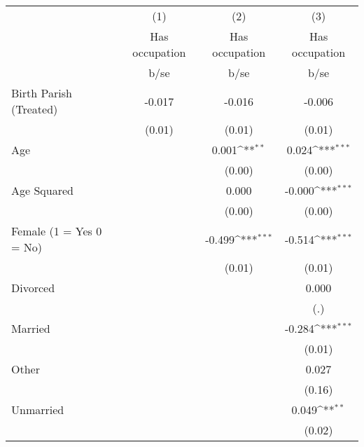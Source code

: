 {
\def\sym#1{\ifmmode^{#1}\else\(^{#1}\)\fi}
\begin{tabular}{l*{3}{c}}
\hline\hline
                    &\multicolumn{1}{c}{(1)}&\multicolumn{1}{c}{(2)}&\multicolumn{1}{c}{(3)}\\
                    &\multicolumn{1}{c}{Has occupation}&\multicolumn{1}{c}{Has occupation}&\multicolumn{1}{c}{Has occupation}\\
                    &        b/se         &        b/se         &        b/se         \\
\hline
Birth Parish (Treated)&      -0.017         &      -0.016         &      -0.006         \\
                    &      (0.01)         &      (0.01)         &      (0.01)         \\
Age                 &                     &       0.001\sym{**} &       0.024\sym{***}\\
                    &                     &      (0.00)         &      (0.00)         \\
Age Squared         &                     &       0.000         &      -0.000\sym{***}\\
                    &                     &      (0.00)         &      (0.00)         \\
Female (1 = Yes 0 = No)&                     &      -0.499\sym{***}&      -0.514\sym{***}\\
                    &                     &      (0.01)         &      (0.01)         \\
Divorced            &                     &                     &       0.000         \\
                    &                     &                     &         (.)         \\
Married             &                     &                     &      -0.284\sym{***}\\
                    &                     &                     &      (0.01)         \\
Other               &                     &                     &       0.027         \\
                    &                     &                     &      (0.16)         \\
Unmarried           &                     &                     &       0.049\sym{**} \\
                    &                     &                     &      (0.02)         \\

\end{tabular}}

